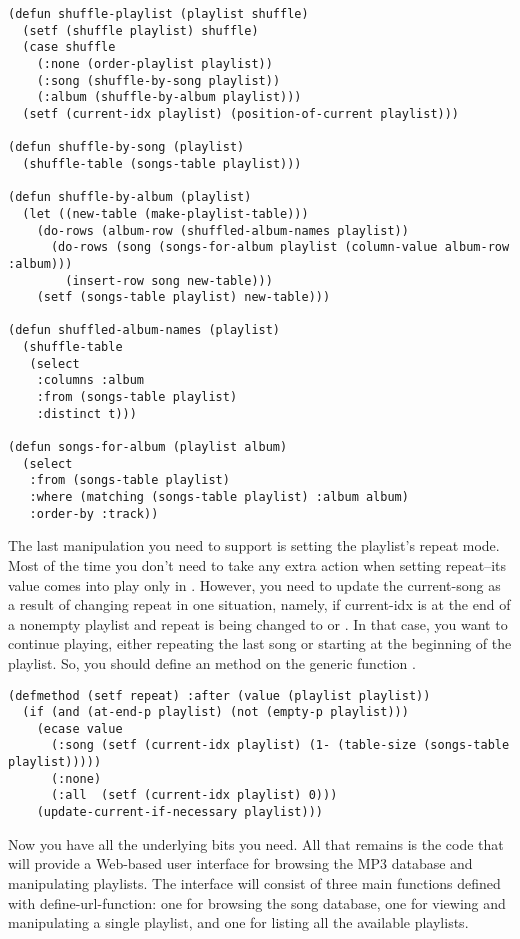 \begin{lstlisting}
(defun shuffle-playlist (playlist shuffle)
  (setf (shuffle playlist) shuffle)
  (case shuffle
    (:none (order-playlist playlist))
    (:song (shuffle-by-song playlist))
    (:album (shuffle-by-album playlist)))
  (setf (current-idx playlist) (position-of-current playlist)))

(defun shuffle-by-song (playlist)
  (shuffle-table (songs-table playlist)))

(defun shuffle-by-album (playlist)
  (let ((new-table (make-playlist-table)))
    (do-rows (album-row (shuffled-album-names playlist))
      (do-rows (song (songs-for-album playlist (column-value album-row :album)))
        (insert-row song new-table)))
    (setf (songs-table playlist) new-table)))

(defun shuffled-album-names (playlist)
  (shuffle-table 
   (select
    :columns :album
    :from (songs-table playlist)
    :distinct t)))

(defun songs-for-album (playlist album)
  (select
   :from (songs-table playlist) 
   :where (matching (songs-table playlist) :album album)
   :order-by :track))
\end{lstlisting}

The last manipulation you need to support is setting the playlist's repeat mode. Most of
the time you don't need to take any extra action when setting repeat--its value comes into
play only in . However, you need to update the current-song
as a result of changing repeat in one situation, namely, if current-idx is at the end of a
nonempty playlist and repeat is being changed to  or . In that
case, you want to continue playing, either repeating the last song or starting at the
beginning of the playlist. So, you should define an  method on the generic
function .

\begin{lstlisting}
(defmethod (setf repeat) :after (value (playlist playlist))
  (if (and (at-end-p playlist) (not (empty-p playlist)))
    (ecase value
      (:song (setf (current-idx playlist) (1- (table-size (songs-table playlist)))))
      (:none)
      (:all  (setf (current-idx playlist) 0)))
    (update-current-if-necessary playlist)))
\end{lstlisting}

Now you have all the underlying bits you need. All that remains is the code that will
provide a Web-based user interface for browsing the MP3 database and manipulating
playlists. The interface will consist of three main functions defined with
define-url-function: one for browsing the song database, one for viewing and manipulating
a single playlist, and one for listing all the available playlists.

